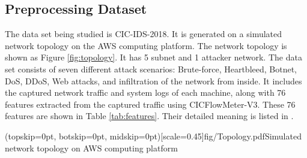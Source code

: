 \documentclass{ieeeaccess}
\theoremstyle{definition}
\begin{document}
\subsection{Preprocessing Dataset}

The data set being studied is CIC-IDS-2018\cite{cic2018}.
It is generated on a simulated network topology on the AWS computing platform. The network topology is shown as Figure \ref{fig:topology}. It has 5 subnet and 1 attacker network.
The data set consists of seven different attack scenarios: Brute-force, Heartbleed, Botnet, DoS, DDoS, Web attacks, and infiltration of the network from inside. It includes the captured network traffic and system logs of each machine, along with 76 features extracted from the captured traffic using CICFlowMeter-V3\cite{cicflowmeter}. These 76 features are shown in Table \ref{tab:features}. Their detailed meaning is listed in \cite{cic2018}.

\Figure[!htpb](topskip=0pt, botskip=0pt, midskip=0pt)[scale=0.45]{fig/Topology.pdf}{Simulated network topology on AWS computing platform\label{fig:topology}}
\end{document}
